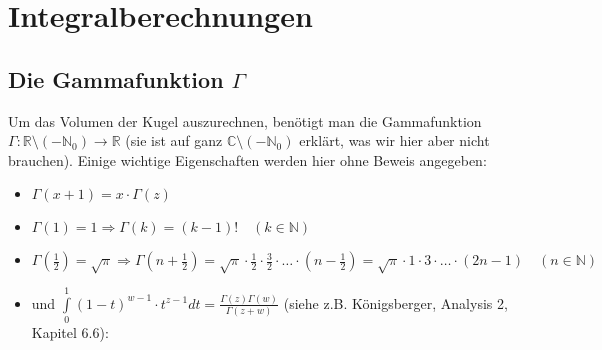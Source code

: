 \documentclass[a4paper,11pt]{report}
\theoremstyle{definition}
\newcommand{\R}{{\ensuremath{\mathbb{R}}}}
\newcommand{\N}{{\ensuremath{\mathbb{N}}}}
\newcommand{\C}{{\ensuremath{\mathbb{C}}}}
\begin{document}
\chapter{Integralberechnungen}
\section{Die Gammafunktion $\Gamma$}
Um das Volumen der Kugel auszurechnen, benötigt man die Gammafunktion \\$\Gamma:\R\setminus(-\N_0)\to\R$ (sie ist auf ganz $\C\setminus(-\N_0)$ erklärt, was wir hier aber nicht brauchen). Einige wichtige Eigenschaften werden hier ohne Beweis angegeben:
\begin{itemize}
\item $\Gamma(x+1)=x\cdot\Gamma(z)$
\item $\Gamma(1)=1\Rightarrow\Gamma(k)=(k-1)!\quad (k\in\N)$
\item $\Gamma(\frac{1}{2})=\sqrt{\pi}\Rightarrow\Gamma(n+\frac{1}{2})=\sqrt{\pi}\cdot\frac{1}{2}\cdot\frac{3}{2}\cdot\ldots\cdot (n-\frac{1}{2})=\sqrt{\pi}\cdot 1\cdot 3\cdot\ldots\cdot (2n-1)\quad (n\in\N)$
\item und $\int\limits_0^1 (1-t)^{w-1}\cdot t^{z-1}dt=\frac{\Gamma(z)\Gamma(w)}{\Gamma(z+w)}$ (siehe z.B. Königsberger, Analysis 2, Kapitel 6.6):
\end{itemize}
\end{document}
